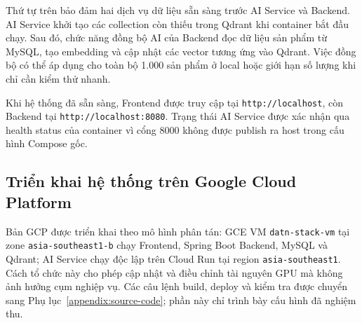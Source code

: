 Thứ tự trên bảo đảm hai dịch vụ dữ liệu sẵn sàng trước AI Service và Backend. AI Service khởi tạo các collection còn thiếu trong Qdrant khi container bắt đầu chạy. Sau đó, chức năng đồng bộ AI của Backend đọc dữ liệu sản phẩm từ MySQL, tạo embedding và cập nhật các vector tương ứng vào Qdrant. Việc đồng bộ có thể áp dụng cho toàn bộ 1.000 sản phẩm ở local hoặc giới hạn số lượng khi chỉ cần kiểm thử nhanh.

Khi hệ thống đã sẵn sàng, Frontend được truy cập tại \texttt{http://localhost}, còn Backend tại \texttt{http://localhost:8080}. Trạng thái AI Service được xác nhận qua health status của container vì cổng 8000 không được publish ra host trong cấu hình Compose gốc.

\subsection{Triển khai hệ thống trên Google Cloud Platform}

Bản GCP được triển khai theo mô hình phân tán: GCE VM \texttt{datn-stack-vm} tại zone \texttt{asia-southeast1-b} chạy Frontend, Spring Boot Backend, MySQL và Qdrant; AI Service chạy độc lập trên Cloud Run tại region \texttt{asia-southeast1}. Cách tổ chức này cho phép cập nhật và điều chỉnh tài nguyên GPU mà không ảnh hưởng cụm nghiệp vụ. Các câu lệnh build, deploy và kiểm tra được chuyển sang Phụ lục~\ref{appendix:source-code}; phần này chỉ trình bày cấu hình đã nghiệm thu.

